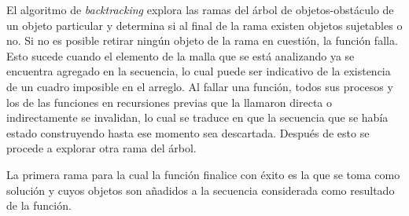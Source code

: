 El algoritmo de \textit{backtracking} explora las ramas del árbol de objetos-obstáculo de un objeto particular y determina si al final de la rama existen objetos sujetables o no.
Si no es posible retirar ningún objeto de la rama en cuestión, la función falla.
Esto sucede cuando el elemento de la malla que se está analizando ya se encuentra agregado en la secuencia, lo cual puede ser indicativo de la existencia de un cuadro imposible en el arreglo.
Al fallar una función, todos sus procesos y los de las funciones en recursiones previas que la llamaron directa o indirectamente se invalidan, lo cual se traduce en que la secuencia que se había estado construyendo hasta ese momento sea descartada.
Después de esto se procede a explorar otra rama del árbol.

La primera rama para la cual la función finalice con éxito es la que se toma como solución y cuyos objetos son añadidos a la secuencia considerada como resultado de la función.
%
